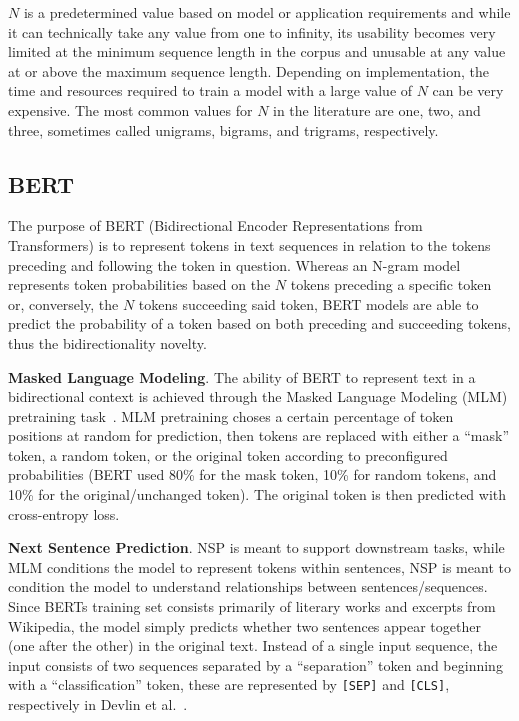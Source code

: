 \documentclass[12pt]{article}
\begin{document}
$N$ is a predetermined value based on model or application requirements and while it can technically take any value from one to infinity, its
usability becomes very limited at the minimum sequence length in the corpus and unusable at any value at or above the maximum sequence length.
Depending on implementation, the time and resources required to train a model with a large value of $N$ can be very expensive. The most common values
for $N$ in the literature are one, two, and three, sometimes called unigrams, bigrams, and trigrams, respectively.

\subsection{BERT}\label{sec:bert}
The purpose of BERT (Bidirectional Encoder Representations from Transformers) is to represent tokens in text sequences in relation to the tokens
preceding and following the token in question. Whereas an N-gram model represents token probabilities based on the $N$ tokens preceding a specific
token or, conversely, the $N$ tokens succeeding said token, BERT models are able to predict the probability of a token based on both preceding and
succeeding tokens, thus the bidirectionality novelty.

\textbf{Masked Language Modeling}. The ability of BERT to represent text in a bidirectional context is achieved through the Masked Language Modeling
(MLM) pretraining task~\cite{devlin_bert_2019}. MLM pretraining choses a certain percentage of token positions at random for prediction, then tokens
are replaced with either a ``mask'' token, a random token, or the original token according to preconfigured probabilities (BERT used 80\% for the mask
token, 10\% for random tokens, and 10\% for the original/unchanged token). The original token is then predicted with cross-entropy loss.

\textbf{Next Sentence Prediction}. NSP is meant to support downstream tasks, while MLM conditions the model to represent tokens within sentences, NSP
is meant to condition the model to understand relationships between sentences/sequences. Since BERTs training set consists primarily of literary works
and excerpts from Wikipedia, the model simply predicts whether two sentences appear together (one after the other) in the original text. Instead of a
single input sequence, the input consists of two sequences separated by a ``separation'' token and beginning with a ``classification'' token, these
are represented by \lstinline|[SEP]| and \lstinline|[CLS]|, respectively in Devlin et al.~\cite{devlin_bert_2019}.
\end{document}
